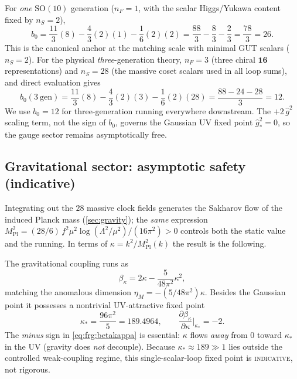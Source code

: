 \begin{remark}
\label{rem:frg:b0}
For \emph{one} $\mathrm{SO}(10)$ generation ($n_{F}=1$, with the scalar
Higgs/Yukawa content fixed by $n_{S}=2$),
\begin{equation}\label{eq:frg:b0one}
  b_{0}
  =\frac{11}{3}(8)-\frac43(2)(1)-\frac16(2)(2)
  =\frac{88}{3}-\frac{8}{3}-\frac{2}{3}
  =\frac{78}{3}=26 .
\end{equation}
This is the canonical anchor at the matching scale with minimal GUT scalars
($n_{S}=2$). For the physical \emph{three}-generation theory, $n_{F}=3$
(three chiral $\mathbf{16}$ representations) and $n_{S}=28$ (the massive
coset scalars used in all loop sums), and direct evaluation gives
\begin{equation}\label{eq:frg:b0three}
  b_{0}(3\ \text{gen})
  =\frac{11}{3}(8)-\frac43(2)(3)-\frac16(2)(28)
  =\frac{88-24-28}{3}=12 .
\end{equation}
We use $b_{0}=12$ for three-generation running everywhere downstream. The
$+2\,\hat g^{2}$ scaling term, not the sign of $b_{0}$, governs the Gaussian
UV fixed point $\hat g^{2}_{\ast}=0$, so the gauge sector remains
asymptotically free.
\end{remark}

\subsection{Gravitational sector: asymptotic safety (indicative)}
\label{sec:frg:gravity}

Integrating out the $28$ massive clock fields generates the Sakharov flow
of the induced Planck mass (\autoref{sec:gravity}); the \emph{same}
expression $M_{\mathrm{Pl}}^{2}=(28/6)\,f^{2}\mu^{2}\log(\Lambda^{2}/\mu^{2})/(16\pi^{2})>0$
controls both the static value and the running. In terms of
$\kappa=k^{2}/M_{\mathrm{Pl}}^{2}(k)$ the result is the following.

\begin{conjecture}
\label{conj:frg:gravity}
The gravitational coupling runs as
\begin{equation}\label{eq:frg:betakappa}
  \beta_{\kappa}=2\kappa-\frac{5}{48\pi^{2}}\kappa^{2},
\end{equation}
matching the anomalous dimension $\eta_{M}=-(5/48\pi^{2})\kappa$. Besides
the Gaussian point it possesses a nontrivial UV-attractive fixed point
\begin{equation}\label{eq:frg:kappastar}
  \kappa_{\ast}=\frac{96\pi^{2}}{5}=189.4964,
  \qquad
  \frac{\partial\beta_{\kappa}}{\partial\kappa}\bigg|_{\kappa_{\ast}}=-2 .
\end{equation}
The \emph{minus} sign in \eqref{eq:frg:betakappa} is essential: $\kappa$
flows \emph{away} from $0$ toward $\kappa_{\ast}$ in the UV (gravity does
\emph{not} decouple). Because $\kappa_{\ast}\approx189\gg1$ lies outside
the controlled weak-coupling regime, this single-scalar-loop fixed point is
\textsc{indicative}, not rigorous.
\end{conjecture}

